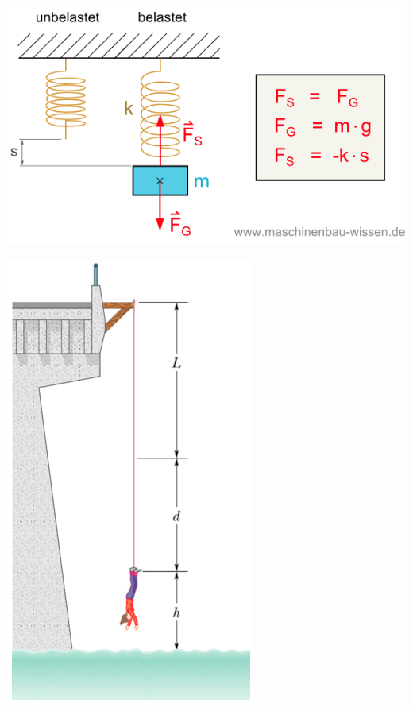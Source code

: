 \begin{minipage}[h!]{0.4\linewidth}
\includegraphics[width=\linewidth]{images/federenergie}
\end{minipage}
\hfill
\begin{minipage}[h!]{0.2\linewidth}
\includegraphics[width=\linewidth]{images/energie}
\end{minipage}
